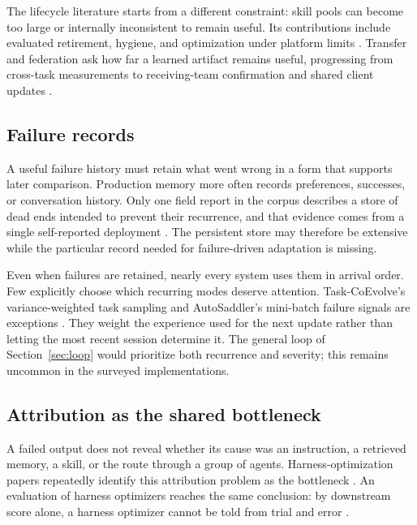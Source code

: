 The lifecycle literature starts from a different constraint: skill pools can become too large or internally inconsistent to remain useful. Its contributions include evaluated retirement, hygiene, and optimization under platform limits \citep{zhang2026ratchet, tanjim2026mocha, liu2026skillsvote, zhang2026librarydrift, wei2026skillsmith, pu2026skillops, wang2026assay}. Transfer and federation ask how far a learned artifact remains useful, progressing from cross-task measurements to receiving-team confirmation and shared client updates \citep{shalev2026ict, li2026combee, qu2026coral, ling2026pace, wang2026evo2team, yang2026federatedskill, nie2026evolvenet}.

\subsection{Failure records}\label{failure-records}

A useful failure history must retain what went wrong in a form that supports later comparison. Production memory more often records preferences, successes, or conversation history. Only one field report in the corpus describes a store of dead ends intended to prevent their recurrence, and that evidence comes from a single self-reported deployment \citep{helwig2026memory}. The persistent store may therefore be extensive while the particular record needed for failure-driven adaptation is missing.

Even when failures are retained, nearly every system uses them in arrival order. Few explicitly choose which recurring modes deserve attention. Task-CoEvolve's variance-weighted task sampling and AutoSaddler's mini-batch failure signals are exceptions \citep{miyai2026taskcoevolve, park2026autosaddler}. They weight the experience used for the next update rather than letting the most recent session determine it. The general loop of Section~\ref{sec:loop} would prioritize both recurrence and severity; this remains uncommon in the surveyed implementations.

\subsection{Attribution as the shared bottleneck}\label{attribution-as-the-shared-bottleneck}

A failed output does not reveal whether its cause was an instruction, a retrieved memory, a skill, or the route through a group of agents. Harness-optimization papers repeatedly identify this attribution problem as the bottleneck \citep{lin2026ahe, zehle2026cantante, lee2026metaharness, nguyen2026harnessevo, liu2026skillsvote}. An evaluation of harness optimizers reaches the same conclusion: by downstream score alone, a harness optimizer cannot be told from trial and error \citep{ong2026harnesseval}.

